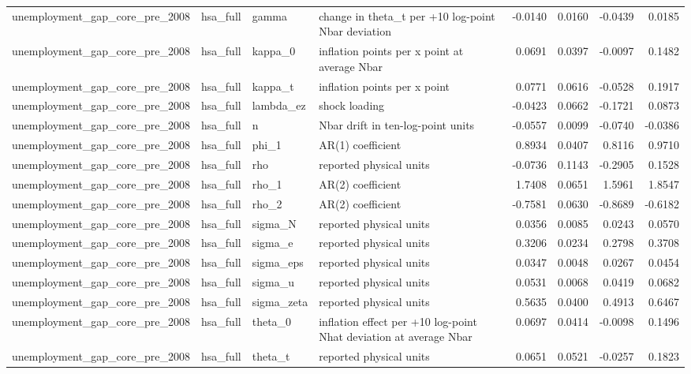 \begin{tabular}{llllrrrr}
unemployment\_gap\_core\_pre\_2008 & hsa\_full & gamma & change in theta\_t per +10 log-point Nbar deviation & -0.0140 & 0.0160 & -0.0439 & 0.0185 \\
unemployment\_gap\_core\_pre\_2008 & hsa\_full & kappa\_0 & inflation points per x point at average Nbar & 0.0691 & 0.0397 & -0.0097 & 0.1482 \\
unemployment\_gap\_core\_pre\_2008 & hsa\_full & kappa\_t & inflation points per x point & 0.0771 & 0.0616 & -0.0528 & 0.1917 \\
unemployment\_gap\_core\_pre\_2008 & hsa\_full & lambda\_ez & shock loading & -0.0423 & 0.0662 & -0.1721 & 0.0873 \\
unemployment\_gap\_core\_pre\_2008 & hsa\_full & n & Nbar drift in ten-log-point units & -0.0557 & 0.0099 & -0.0740 & -0.0386 \\
unemployment\_gap\_core\_pre\_2008 & hsa\_full & phi\_1 & AR(1) coefficient & 0.8934 & 0.0407 & 0.8116 & 0.9710 \\
unemployment\_gap\_core\_pre\_2008 & hsa\_full & rho & reported physical units & -0.0736 & 0.1143 & -0.2905 & 0.1528 \\
unemployment\_gap\_core\_pre\_2008 & hsa\_full & rho\_1 & AR(2) coefficient & 1.7408 & 0.0651 & 1.5961 & 1.8547 \\
unemployment\_gap\_core\_pre\_2008 & hsa\_full & rho\_2 & AR(2) coefficient & -0.7581 & 0.0630 & -0.8689 & -0.6182 \\
unemployment\_gap\_core\_pre\_2008 & hsa\_full & sigma\_N & reported physical units & 0.0356 & 0.0085 & 0.0243 & 0.0570 \\
unemployment\_gap\_core\_pre\_2008 & hsa\_full & sigma\_e & reported physical units & 0.3206 & 0.0234 & 0.2798 & 0.3708 \\
unemployment\_gap\_core\_pre\_2008 & hsa\_full & sigma\_eps & reported physical units & 0.0347 & 0.0048 & 0.0267 & 0.0454 \\
unemployment\_gap\_core\_pre\_2008 & hsa\_full & sigma\_u & reported physical units & 0.0531 & 0.0068 & 0.0419 & 0.0682 \\
unemployment\_gap\_core\_pre\_2008 & hsa\_full & sigma\_zeta & reported physical units & 0.5635 & 0.0400 & 0.4913 & 0.6467 \\
unemployment\_gap\_core\_pre\_2008 & hsa\_full & theta\_0 & inflation effect per +10 log-point Nhat deviation at average Nbar & 0.0697 & 0.0414 & -0.0098 & 0.1496 \\
unemployment\_gap\_core\_pre\_2008 & hsa\_full & theta\_t & reported physical units & 0.0651 & 0.0521 & -0.0257 & 0.1823 \\

\end{tabular}
